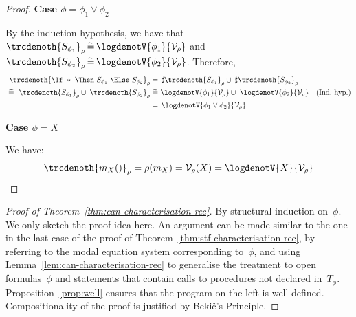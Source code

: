 \documentclass[a4paper,numberwithinsect]{lipics-v2021}
\begin{document}
\begin{proof}
  \noindent\textbf{Case $\phi = \phi_1 \lor \phi_2$} 

  By the induction hypothesis, we have that
  $\trcdenoth{S_{\phi_1}}_\rho \,\widetilde{=}\, 
   \logdenotV{\phi_1}{\mathcal{V}_\rho}$
  and
  $\trcdenoth{S_{\phi_2}}_\rho \,\widetilde{=}\, 
   \logdenotV{\phi_2}{\mathcal{V}_\rho}$.
  Therefore,
  \begin{align*}
    \trcdenoth{\If\ \ast\ \Then\ S_{\phi_1}\ \Else\ S_{\phi_2}}_\rho
    & =\, \sharp\trcdenoth{S_{\phi_1}}_\rho\cup\;\sharp\trcdenoth{S_{\phi_2}}_\rho\\
     \;\widetilde{=}\ \ \trcdenoth{S_{\phi_1}}_\rho\cup\;\trcdenoth{S_{\phi_2}}_\rho 
    & \;\widetilde{=}\ \logdenotV{\phi_1}{\mathcal{V}_\rho} \cup\ 
            \logdenotV{\phi_2}{\mathcal{V}_\rho}\quad\text{(Ind.\ hyp.)}\\
    & =\, \logdenotV{\phi_1\lor\phi_2}{\mathcal{V}_\rho}
  \end{align*}

  
  \noindent\textbf{Case $\phi = X$}

  We have:
  \begin{align*}
    \trcdenoth{m_X ()}_\rho
     = \rho (m_X) 
     = \mathcal{V}_\rho (X) 
     = \logdenotV{X}{\mathcal{V}_\rho}
  \end{align*}
\end{proof}

\begin{proof}[Proof of Theorem~\ref{thm:can-characterisation-rec}]
  By structural induction on~$\phi$.  We only sketch the proof idea
  here.  An argument can be made similar to the one in the last case
  of the proof of Theorem~\ref{thm:stf-characterisation-rec}, by
  referring to the modal equation system corresponding to~$\phi$, and
  using Lemma~\ref{lem:can-characterisation-rec} to generalise the
  treatment to open formulas~$\phi$ and statements that contain calls
  to procedures not declared in~$T_\phi$.  Proposition~\ref{prop:well}
  ensures that the program on the left is well-defined.
  Compositionality of the proof is justified by Beki\v{c}'s
  Principle. %
\end{proof}
\end{document}
